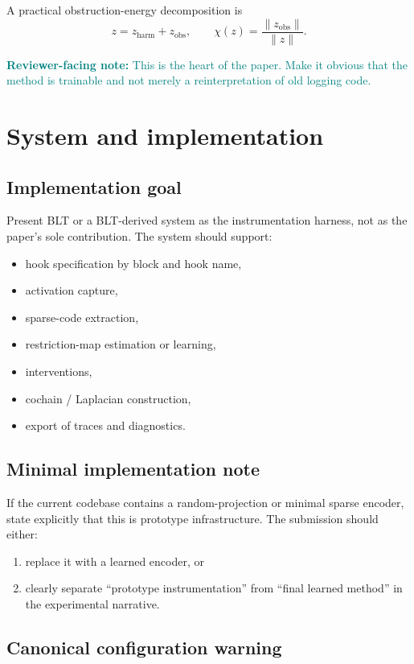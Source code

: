 \documentclass[11pt]{article}
\newcommand{\reviewer}[1]{\textcolor{teal}{\textbf{Reviewer-facing note:} #1}}
\begin{document}
A practical obstruction-energy decomposition is
\[
z = z_{\mathrm{harm}} + z_{\mathrm{obs}},
\qquad
\chi(z) = \frac{\|z_{\mathrm{obs}}\|}{\|z\|}.
\]

\reviewer{This is the heart of the paper. Make it obvious that the method is trainable and not merely a reinterpretation of old logging code.}

\section{System and implementation}

\subsection{Implementation goal}

Present BLT or a BLT-derived system as the instrumentation harness, not as the paper's sole contribution. The system should support:
\begin{itemize}[leftmargin=1.5em]
    \item hook specification by block and hook name,
    \item activation capture,
    \item sparse-code extraction,
    \item restriction-map estimation or learning,
    \item interventions,
    \item cochain / Laplacian construction,
    \item export of traces and diagnostics.
\end{itemize}

\subsection{Minimal implementation note}

If the current codebase contains a random-projection or minimal sparse encoder, state explicitly that this is prototype infrastructure. The submission should either:
\begin{enumerate}[leftmargin=1.5em]
    \item replace it with a learned encoder, or
    \item clearly separate ``prototype instrumentation'' from ``final learned method'' in the experimental narrative.
\end{enumerate}

\subsection{Canonical configuration warning}
\end{document}
